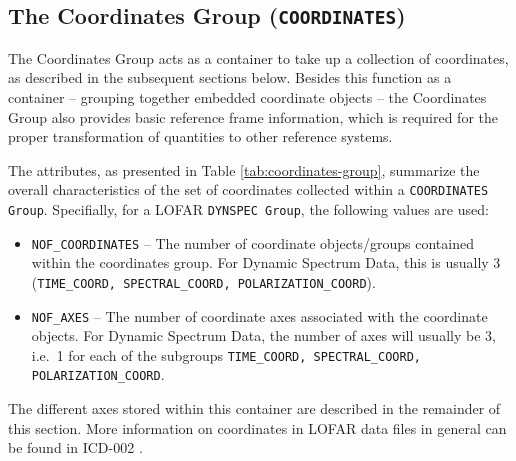 \documentclass[a4paper,10pt,bibtotoc]{scrartcl}
\begin{document}

\subsection{The Coordinates Group ({\tt COORDINATES})}
\label{sec:coordinates group}

The Coordinates Group acts as a container to take up a collection of coordinates,
as described in the subsequent sections below. Besides this function as a
container -- grouping together embedded coordinate objects -- the
Coordinates Group also provides basic reference frame information,
which is required for the proper transformation of quantities to other
reference systems.



The attributes, as presented in Table \ref{tab:coordinates-group},  summarize the
overall characteristics of the set of coordinates collected within a
\texttt{COORDINATES Group}. Specifially, for a LOFAR \texttt{DYNSPEC Group},
the following values are used:
\begin{itemize}
\item \verb|NOF_COORDINATES| -- The number of coordinate objects/groups
contained within the coordinates group. For Dynamic Spectrum Data, this is
usually 3
(\texttt{TIME\_COORD, SPECTRAL\_COORD, POLARIZATION\_COORD}).
\item \verb|NOF_AXES| -- The number of coordinate axes associated with the 
  coordinate objects. For Dynamic Spectrum Data, the number of axes will usually
  be 3, i.e.~1 for each of the subgroups 	
  \texttt{TIME\_COORD, SPECTRAL\_COORD, POLARIZATION\_COORD}.
\end{itemize}


  
The different axes stored within this container are described in the remainder of this
section. 
More information on coordinates in LOFAR data files in general can be found 
in ICD-002 \cite{lofar.icd.002}. 
\end{document}
